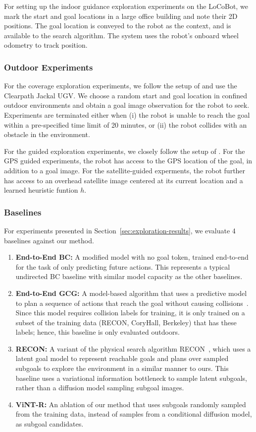 For setting up the indoor guidance exploration experiments on the LoCoBot, we mark the start and goal locations in a large office building and note their 2D positions. The goal location is conveyed to the robot as the context, and is available to the search algorithm. The system uses the robot's onboard wheel odometry to track position.

\subsubsection{Outdoor Experiments}

For the coverage exploration experiments, we follow the setup of \citet{shah2021rapid} and use the Clearpath Jackal UGV. We choose a random start and goal location in confined outdoor environments and obtain a goal image observation for the robot to seek. Experiments are terminated either when (i) the robot is unable to reach the goal within a pre-specified time limit of 20 minutes, or (ii) the robot collides with an obstacle in the environment.

For the guided exploration experiments, we closely follow the setup of \citet{shah2022viking}. For the GPS guided experiments, the robot has access to the GPS location of the goal, in addition to a goal image. For the satellite-guided experments, the robot further has access to an overhead satellite image centered at its current location and a learned heuristic funtion $h$.

\subsubsection{Baselines}

For experiments presented in Section~\ref{sec:exploration-results}, we evaluate 4 baselines against our method.
\begin{enumerate}
    \item \textbf{End-to-End BC:} A modified \ModelName model with no goal token, trained end-to-end for the task of only predicting future actions. This represents a typical undirected BC baseline with similar model capacity as the other baselines.
    \item \textbf{End-to-End GCG:} A model-based algorithm that uses a predictive model to plan a sequence of actions that reach the goal without causing collisions~\cite{kahn2018gcg}. Since this model requires collision labels for training, it is only trained on a subset of the training data (RECON, CoryHall, Berkeley) that has these labels; hence, this baseline is only evaluated outdoors.
    \item \textbf{RECON:} A variant of the physical search algorithm RECON~\cite{shah2021rapid}, which uses a latent goal model to represent reachable goals and plans over sampled subgoals to explore the environment in a similar manner to ours. This baseline uses a variational information bottleneck to sample latent subgoals, rather than a diffusion model sampling subgoal images.
    \item \textbf{ViNT-R:} An ablation of our method that uses subgoals randomly sampled from the training data, instead of samples from a conditional diffusion model, as subgoal candidates.
\end{enumerate}

